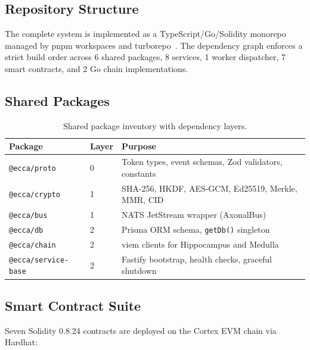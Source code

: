 \documentclass[11pt,twocolumn]{article}
\theoremstyle{definition}
\theoremstyle{plain}
\theoremstyle{remark}
\begin{document}
\subsection{Repository Structure}

The complete system is implemented as a TypeScript/Go/Solidity monorepo managed by pnpm workspaces and turborepo~\cite{turborepo2023}. The dependency graph enforces a strict build order across 6 shared packages, 8 services, 1 worker dispatcher, 7 smart contracts, and 2 Go chain implementations.

\subsection{Shared Packages}

\begin{table}[H]
\centering
\caption{Shared package inventory with dependency layers.}
\label{tab:packages}
\small
\begin{tabular}{@{}llp{3.5cm}@{}}
\toprule
\textbf{Package} & \textbf{Layer} & \textbf{Purpose}\\
\midrule
\texttt{@ecca/proto} & 0 & Token types, event schemas, Zod validators, constants\\
\texttt{@ecca/crypto} & 1 & SHA-256, HKDF, AES-GCM, Ed25519, Merkle, MMR, CID\\
\texttt{@ecca/bus} & 1 & NATS JetStream wrapper (AxonalBus)\\
\texttt{@ecca/db} & 2 & Prisma ORM schema, \texttt{getDb()} singleton\\
\texttt{@ecca/chain} & 2 & viem clients for Hippocampus and Medulla\\
\texttt{@ecca/service-base} & 2 & Fastify bootstrap, health checks, graceful shutdown\\
\bottomrule
\end{tabular}
\end{table}

\subsection{Smart Contract Suite}

Seven Solidity 0.8.24 contracts are deployed on the Cortex EVM chain via Hardhat:
\end{document}
